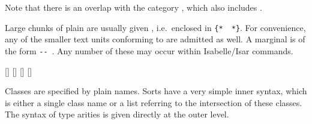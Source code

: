 \begin{isabellebody}
\begin{isamarkuptext}
  Note that there is an overlap with the category \hyperlink{syntax.name}{\mbox{}},
  which also includes \hyperlink{syntax.nat}{\mbox{}}.%
\end{isamarkuptext}%
\isamarkuptrue%
%
\isamarkuptrue%
%
\begin{isamarkuptext}%
Large chunks of plain \hyperlink{syntax.text}{\mbox{}} are usually given
  \hyperlink{syntax.verbatim}{\mbox{}}, i.e.\ enclosed in \verb|{|\verb|*|~~\verb|*|\verb|}|.  For convenience,
  any of the smaller text units conforming to \hyperlink{syntax.nameref}{\mbox{}} are
  admitted as well.  A marginal \hyperlink{syntax.comment}{\mbox{}} is of the form
  \verb|--|~\hyperlink{syntax.text}{\mbox{}}.  Any number of these may occur
  within Isabelle/Isar commands.

  \begin{railoutput}
\rail@bar
{}[]
[]
\rail@endbar
\rail@end
{}
[]
[]
\rail@end
\end{railoutput}%
\end{isamarkuptext}%
\isamarkuptrue%
%
\isamarkuptrue%
%
\begin{isamarkuptext}%
Classes are specified by plain names.  Sorts have a very simple
  inner syntax, which is either a single class name  or a
  list  referring to the
  intersection of these classes.  The syntax of type arities is given
  directly at the outer level.


\end{isamarkuptext}
\end{isabellebody}
